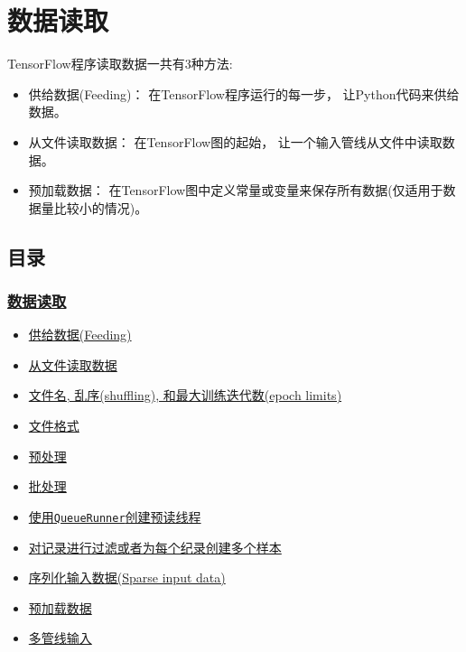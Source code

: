 

\section{数据读取 }\label{ux6570ux636eux8bfbux53d6}

TensorFlow程序读取数据一共有3种方法:

\begin{itemize}
\tightlist
\item
  供给数据(Feeding)： 在TensorFlow程序运行的每一步，
  让Python代码来供给数据。
\item
  从文件读取数据： 在TensorFlow图的起始，
  让一个输入管线从文件中读取数据。
\item
  预加载数据：
  在TensorFlow图中定义常量或变量来保存所有数据(仅适用于数据量比较小的情况)。
\end{itemize}

\subsection{目录}\label{ux76eeux5f55}

\subsubsection{\texorpdfstring{\protect\hyperlink{AUTOGENERATED-reading-data}{数据读取}}{数据读取}}\label{ux6570ux636eux8bfbux53d6-1}

\begin{itemize}
\tightlist
\item
  \protect\hyperlink{Feeding}{供给数据(Feeding)}
\item
  \protect\hyperlink{AUTOGENERATED-reading-from-files}{从文件读取数据}
\item
  \protect\hyperlink{AUTOGENERATED-filenames--shuffling--and-epoch-limits}{文件名,
  乱序(shuffling), 和最大训练迭代数(epoch limits)}
\item
  \protect\hyperlink{AUTOGENERATED-file-formats}{文件格式}
\item
  \protect\hyperlink{AUTOGENERATED-preprocessing}{预处理}
\item
  \protect\hyperlink{AUTOGENERATED-batching}{批处理}
\item
  \protect\hyperlink{QueueRunner}{使用\texttt{QueueRunner}创建预读线程}
\item
  \protect\hyperlink{AUTOGENERATED-filtering-records-or-producing-multiple-examples-per-record}{对记录进行过滤或者为每个纪录创建多个样本}
\item
  \protect\hyperlink{AUTOGENERATED-sparse-input-data}{序列化输入数据(Sparse
  input data)}
\item
  \protect\hyperlink{AUTOGENERATED-preloaded-data}{预加载数据}
\item
  \protect\hyperlink{AUTOGENERATED-multiple-input-pipelines}{多管线输入}
\end{itemize}

